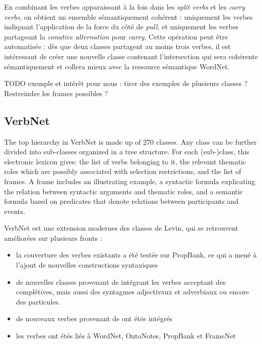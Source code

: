 En combinant les verbes apparaissant à la fois dans les \textit{split verbs} et
les \textit{carry verbs}, on obtient un ensemble sémantiquement cohérent :
uniquement les verbes indiquant l'application de la force du côté de
\textit{pull}, et uniquement les verbes partageant la \textit{conative
alternation} pour \textit{carry}. Cette opération peut être automatisée : dès
que deux classes partagent au moins trois verbes, il est intéressant de créer
une nouvelle classe contenant l'intersection qui sera cohérente sémantiquement
et collera mieux avec la ressource sémantique WordNet.


TODO exemple et intérêt pour nous : tirer des exemples de plusieurs classes ?
Restreindre les frames possibles ?

\subsection{VerbNet}

The top hierarchy in VerbNet is made up of 270 classes. Any class can be
further divided into sub-classes organized in a tree structure. For each
(sub-)class, this electronic lexicon gives:  the list of verbs belonging to it,
the relevant thematic roles which are possibly associated with selection
restrictions, and the list of frames. A frame includes an illustrating example,
a syntactic formula explicating the relation between syntactic arguments and
thematic roles, and a semantic formula  based on predicates that denote
relations between participants and events.


VerbNet est une extension modernes des classes de Levin, qui se retrouvent
améliorées sur plusieurs fronts :

\begin{itemize}

    \item la couverture des verbes existants a été testée sur PropBank, ce qui
        a mené à l'ajout de nouvelles constructions syntaxiques

    \item de nouvelles classes provenant de \cite{korhonen2004extended}
        intégrant les verbes acceptant des complétives, mais aussi des
        syntagmes adjectivaux et adverbiaux ou encore des particules.

    \item de nouveaux verbes provenant de \cite{dorr2001lcs} ont étés intégrés

    \item les verbes ont étés liés à WordNet, OntoNotes, PropBank et FrameNet
        \citep{palmer2009semlink}

\end{itemize}

